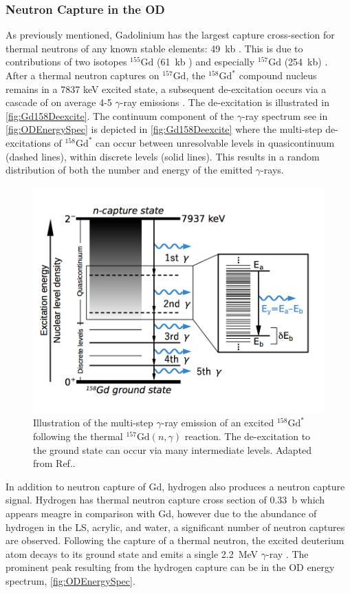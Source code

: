 \subsubsection{Neutron Capture in the OD}
As previously mentioned, Gadolinium has the largest capture cross-section for thermal neutrons of any known stable elements: 49~kb \cite{Hagiwara:2018kmr}. This is due to contributions of two isotopes $^{155}\text{Gd}$ (61~kb ) and especially $^{157}\text{Gd}$ (254~kb) \cite{Hagiwara:2018kmr}. After a thermal neutron captures on $^{157}\text{Gd}$, the $^{158}\text{Gd}^*$ compound nucleus remains in a 7837 keV excited state, a subsequent de-excitation occurs via a cascade of on average 4-5 $\gamma$-ray emissions \cite{Hagiwara:2018kmr}. The de-excitation is illustrated in \autoref{fig:Gd158Deexcite}. The continuum component of the $\gamma$-ray spectrum see in \autoref{fig:ODEnergySpec} is depicted in \autoref{fig:Gd158Deexcite} where the multi-step de-excitations of $^{158}\text{Gd}^*$ can occur between unresolvable levels in quasicontinuum (dashed lines), within discrete levels (solid lines). This results in a random distribution of both the number and energy of the emitted $\gamma$-rays. 

\begin{figure}
    \centering
    \includegraphics[width=0.6\linewidth]{figures/LZ/ContinuumEmission2.png}
    \caption{Illustration of the multi-step $\gamma$-ray emission of an excited $^{158}\text{Gd}^*$ following the thermal $^{157}\text{Gd}(n,\gamma)$ reaction. The de-excitation to the ground state can occur via many intermediate levels. Adapted from Ref.\cite{Hagiwara:2018kmr}.}
    \label{fig:Gd158Deexcite}
\end{figure}

In addition to neutron capture of Gd, hydrogen also produces a neutron capture signal. Hydrogen has thermal neutron capture cross section of 0.33~b which appears meagre in comparison with Gd, however due to the abundance of hydrogen in the LS, acrylic, and water, a significant number of neutron captures are observed. Following the capture of a thermal neutron, the excited deuterium atom decays to its ground state and emits a single 2.2~MeV $\gamma$-ray \cite{LZTDR}. The prominent peak resulting from the hydrogen capture can be in the OD energy spectrum, \autoref{fig:ODEnergySpec}.


